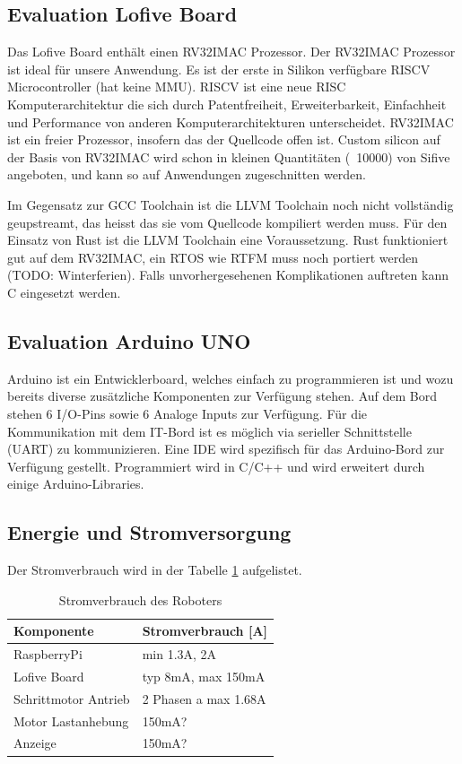 \documentclass[a4paper]{report}
\begin{document}
\subsection{Evaluation Lofive Board}
\label{app:ssec:EvalLofive}
Das Lofive Board enthält einen RV32IMAC Prozessor. Der RV32IMAC Prozessor ist
ideal für unsere Anwendung. Es ist der erste in Silikon verfügbare RISCV
Microcontroller (hat keine MMU). RISCV ist eine neue RISC Komputerarchitektur
die sich durch Patentfreiheit, Erweiterbarkeit, Einfachheit und Performance von
anderen Komputerarchitekturen unterscheidet. RV32IMAC ist ein freier Prozessor,
insofern das der Quellcode offen ist. Custom silicon auf der Basis von RV32IMAC
wird schon in kleinen Quantitäten (~10000) von Sifive angeboten, und kann so
auf Anwendungen zugeschnitten werden.

Im Gegensatz zur GCC Toolchain ist die LLVM Toolchain noch nicht vollständig
geupstreamt, das heisst das sie vom Quellcode kompiliert werden muss. Für den
Einsatz von Rust ist die LLVM Toolchain eine Voraussetzung. Rust funktioniert
gut auf dem RV32IMAC, ein RTOS wie RTFM muss noch portiert werden (TODO:
Winterferien). Falls unvorhergesehenen Komplikationen auftreten kann C
eingesetzt werden.

\subsection{Evaluation Arduino UNO}
\label{app:ssec:ArduinoUno}
Arduino ist ein Entwicklerboard, welches einfach zu programmieren ist und wozu bereits diverse zusätzliche Komponenten zur Verfügung stehen. Auf dem Bord stehen 6 I/O-Pins sowie 6 Analoge Inputs zur Verfügung. Für die Kommunikation mit dem IT-Bord ist es möglich via serieller Schnittstelle (UART) zu kommunizieren. Eine IDE wird spezifisch für das Arduino-Bord zur Verfügung gestellt. Programmiert wird in C/C++ und wird erweitert durch einige Arduino-Libraries.

\subsection{Energie und Stromversorgung}
\label{app:ssec:EnergieStrom}
Der Stromverbrauch wird in der Tabelle \ref{tab:stromverbrauchstabelle}
aufgelistet.

\noindent
\begin{table}[h!]
	\begin{tabular}{|p{}|p{}|}
		\hline
		\textbf{Komponente} & \textbf{Stromverbrauch [A]} \\
		\hline
		RaspberryPi & min 1.3A, 2A \\
    \hline
    Lofive Board & typ 8mA, max 150mA \\
    \hline
    Schrittmotor Antrieb & 2 Phasen a max 1.68A \\
    \hline
    Motor Lastanhebung & 150mA? \\
    \hline
    Anzeige & 150mA? \\
		\hline
	\end{tabular}
	\caption{Stromverbrauch des Roboters}
	\label{tab:stromverbrauchstabelle}
\end{table}
\end{document}
